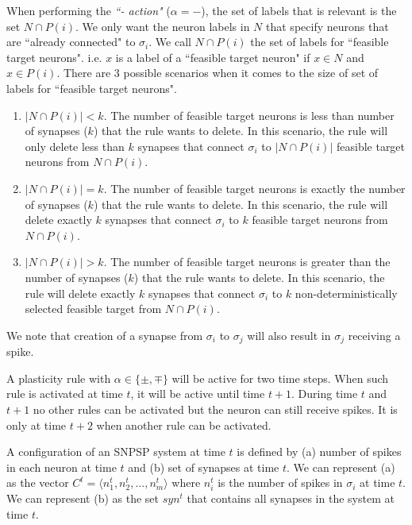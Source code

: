 \documentclass[smallextended]{svjour3}
\begin{document}
When performing the \textit{``- action"} ($\alpha = -$), the set of labels that is relevant is the set $N \cap P(i)$. We only want the neuron labels 
in $N$ that specify neurons that are ``already connected" to $\sigma_i$. We call $N \cap P(i)$  the set of labels for ``feasible target neurons". 
i.e. $x$ is a label of a ``feasible target neuron" if $x \in N$ and $x \in P(i)$. There are 3 possible scenarios when it comes to the size of
set of labels for ``feasible target neurons". 
\begin{enumerate}
   \item $|N \cap P(i)| < k$. The number of feasible target neurons is less than number of synapses ($k$) that the rule wants to delete. In this
         scenario, the rule will only delete less than $k$ synapses that connect $\sigma_i$ to $|N \cap P(i)|$ feasible target neurons from $N \cap 
         P(i)$.
   \item $|N \cap P(i)| = k$. The number of feasible target neurons is exactly the number of synapses ($k$) that the rule wants to delete. In this 
         scenario, the rule will delete exactly $k$ synapses that connect $\sigma_i$ to $k$ feasible target neurons from $N \cap P(i)$.
   \item $|N \cap P(i)| > k$. The number of feasible target neurons is greater than the number of synapses ($k$) that the rule wants to delete. In 
         this scenario, the rule will delete exactly $k$ synapses that connect $\sigma_i$ to $k$ non-deterministically selected feasible target 
         from $N \cap P(i)$.
\end{enumerate}

We note that creation of a synapse from $\sigma_i$ to $\sigma_j$ will also result in $\sigma_j$ receiving a spike. 
  
A plasticity rule with $\alpha \in \{\pm,\mp\}$ will be active for two time steps. When such rule is activated at time $t$, it will be active until 
time $t+1$. During time $t$ and $t+1$ no other rules can be activated but the neuron can still receive spikes. It is only at time $t+2$ when another
rule can be activated. 

A configuration of an SNPSP system at time $t$ is defined by (a) number of spikes in each neuron at time $t$ and (b) set of synapses at time $t$. 
We can represent (a) as the vector $C^t = \langle n_1^t, n_2^t, ...,n_m^t\rangle$ where $n_i^t$ is the number of spikes in $\sigma_i$ at time $t$.
We can represent (b) as the set $syn^t$ that contains all synapses in the system at time $t$.
\end{document}

